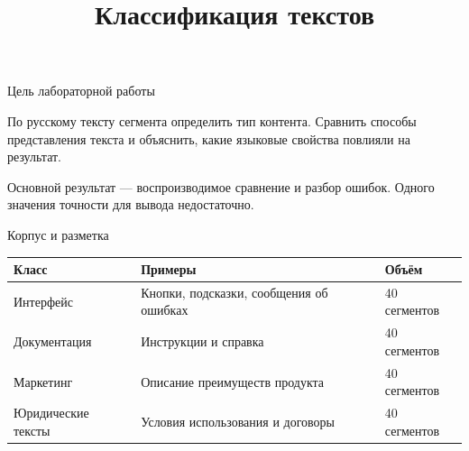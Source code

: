 \documentclass[aspectratio=169,12pt]{beamer}
\author{}\date{}
\title{Классификация текстов}
\begin{document}
\begin{frame}[plain]\vspace{0.6cm}{\large Лабораторная работа № 1: признаки, модели и языковой разбор ошибок\par}\end{frame}
\begin{frame}{Цель лабораторной работы}
\color{ink}
{\small По русскому тексту сегмента определить тип контента. Сравнить способы представления текста и объяснить, какие языковые свойства повлияли на результат.
\par\vspace{0.6em}Основной результат — воспроизводимое сравнение и разбор ошибок. Одного значения точности для вывода недостаточно.}
\end{frame}

\begin{frame}{Корпус и разметка}
\color{ink}
{\small\renewcommand{\arraystretch}{1.15}\begin{tabular}{@{}Л{0.25} Л{0.47} Л{0.2}@{}}\toprule
Класс & Примеры & Объём\\\midrule
Интерфейс & Кнопки, подсказки, сообщения об ошибках & 40 сегментов\\[0.15em]
Документация & Инструкции и справка & 40 сегментов\\[0.15em]
Маркетинг & Описание преимуществ продукта & 40 сегментов\\[0.15em]
Юридические тексты & Условия использования и договоры & 40 сегментов\\[0.15em]\bottomrule\end{tabular}}
\end{frame}
\end{document}
